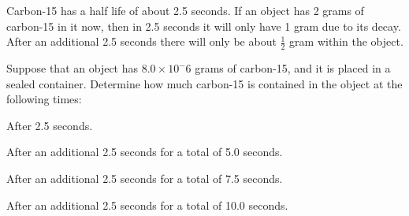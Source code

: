 
\begin{problem}
\item Carbon-15 has a half life of about 2.5 seconds. If an object has
  2 grams of carbon-15 in it now, then in 2.5 seconds it will only
  have 1 gram due to its decay. After an additional 2.5 seconds there
  will only be about $\frac{1}{2}$ gram within the object. 

  Suppose that an object has $8.0\times 10^-{6}$ grams of carbon-15,
  and it is placed in a sealed container. Determine how much carbon-15
  is contained in the object at the following times:

  \begin{subproblem}
  \item After 2.5 seconds.
    \vfill
  \item After an additional 2.5 seconds for a total of 5.0 seconds.
    \vfill
  \item After an additional 2.5 seconds for a total of 7.5 seconds.
    \vfill
  \item After an additional 2.5 seconds for a total of 10.0 seconds.
    \vfill
  \end{subproblem}
\end{problem}


